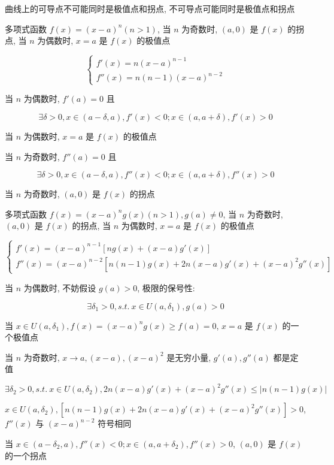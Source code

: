 \begin{corollary}[曲线的极值点和拐点]
	曲线上的可导点不可能同时是极值点和拐点, 不可导点可能同时是极值点和拐点
\end{corollary}

\begin{proposition}\label{pro: 命题一}
	多项式函数 $f(x) = (x-a)^{n}(n>1)$, 当 $n$ 为奇数时, $(a,0)$ 是 $f(x)$ 的拐点, 当 $n$ 为偶数时, $x=a$ 是 $f(x)$ 的极值点
\end{proposition}
\begin{anymark}[证明]

	$$\begin{cases}
		f'(x) = n(x-a)^{n-1}\\
		f''(x) = n(n-1)(x-a)^{n-2}
	\end{cases}$$

	当 $n$ 为偶数时, $f'(a) = 0$ 且 

	$$\exists \delta > 0, x\in (a-\delta,a),f'(x)<0; x\in (a,a+\delta),f'(x)>0$$
	
	当 $n$ 为偶数时, $x=a$ 是 $f(x)$ 的极值点
	
	当 $n$ 为奇数时, $f''(a) = 0$ 且
	
	$$\exists \delta > 0, x\in (a-\delta,a),f''(x)<0; x\in (a,a+\delta),f''(x)>0$$

	当 $n$ 为奇数时, $(a,0)$ 是 $f(x)$ 的拐点
	

\end{anymark}


\begin{proposition}\label{pro: 命题二}
	多项式函数 $f(x) = (x-a)^{n}g(x)(n>1), g(a)\neq 0$, 当 $n$ 为奇数时, $(a,0)$ 是 $f(x)$ 的拐点, 当 $n$ 为偶数时, $x=a$ 是 $f(x)$ 的极值点
\end{proposition}
\begin{anymark}[证明]

	$$\begin{cases}
		f'(x) = (x-a)^{n-1} \left[ ng(x) + (x-a)g'(x) \right]\\
		f''(x) = (x-a)^{n-2} \left[ n(n-1)g(x) + 2n(x-a)g'(x) + (x-a)^{2}g''(x) \right]
	\end{cases}$$

	当 $n$ 为偶数时, 不妨假设 $g(a) > 0$, 极限的保号性:
	
	$$\exists \delta_{1} > 0, s.t.\ x\in U(a,\delta_{1}), g(a) > 0$$
	
	当 $x\in U(a,\delta_{1}), f(x) = (x-a)^{n}g(x) \geq f(a) = 0$, $x=a$ 是 $f(x)$ 的一个极值点


	当 $n$ 为奇数时, $x\to a,(x-a),(x-a)^{2}$ 是无穷小量, $g'(a),g''(a)$ 都是定值

	$$\exists \delta_{2} > 0, s.t.\ x\in U(a,\delta_{2}), 2n(x-a)g'(x)+(x-a)^{2}g''(x)\leq |n(n-1)g(x)| $$

	$x\in U(a,\delta_{2}), \left[ n(n-1)g(x) + 2n(x-a)g'(x) + (x-a)^{2}g''(x) \right] > 0$, $f''(x)$ 与 $(x-a)^{n-2}$ 符号相同

	当 $x\in (a-\delta_{2},a), f''(x) < 0; x\in (a,a+\delta_{2}), f''(x) > 0$, $(a,0)$ 是 $f(x)$ 的一个拐点
\end{anymark}

